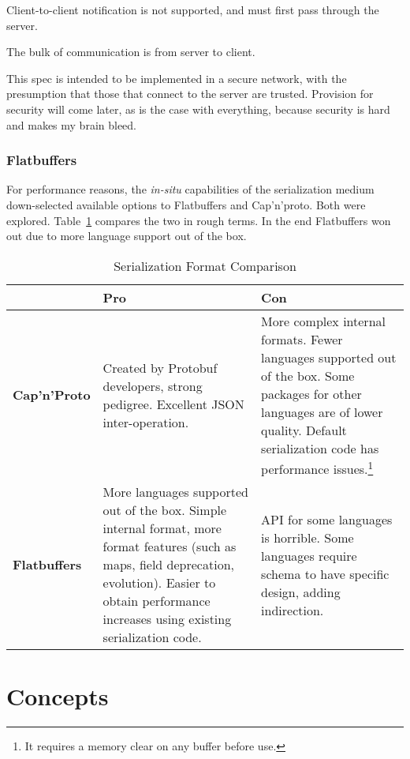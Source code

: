 \documentclass[11pt, oneside]{amsart}
\begin{document}
Client-to-client notification is not supported, and must first pass through the server.

The bulk of communication is from server to client.

This spec is intended to be implemented in a secure network, with the presumption that those that connect to the server are trusted. Provision for security will come later, as is the case with everything, because security is hard and makes my brain bleed.

\subsubsection{Flatbuffers}

For performance reasons, the \textit{in-situ} capabilities of the serialization medium down-selected available options to Flatbuffers and Cap'n'proto. Both were explored. Table~\ref{tab:serial_comp} compares the two in rough terms. In the end Flatbuffers won out due to more language support out of the box. 

\begin{table}[htbp]
\begin{tabularx}{.99\textwidth}{p{.9in}XX}
	\toprule
	~ & \textbf{Pro} & \textbf{Con} \\
	\midrule
	\textbf{Cap'n'Proto} & Created by Protobuf developers, strong pedigree. Excellent JSON inter-operation.  & More complex internal formats. Fewer languages supported out of the box. Some packages for other languages are of lower quality. Default serialization code has performance issues.\footnote{It requires a memory clear on any buffer before use.} \\
	\midrule
	\textbf{Flatbuffers} & More languages supported out of the box. Simple internal format, more format features (such as maps, field deprecation, evolution). Easier to obtain performance increases using existing serialization code. & API for some languages is horrible. Some languages require schema to have specific design, adding indirection. \\
	\bottomrule
\end{tabularx}	
	\caption{Serialization Format Comparison}
	\label{tab:serial_comp}
\end{table}

\section{Concepts}
\end{document}
